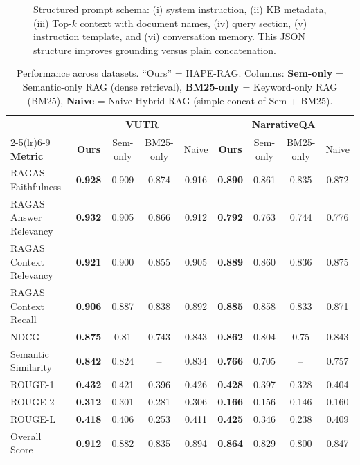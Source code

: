 \documentclass[10pt,twocolumn,letterpaper]{article}
\begin{document}
\begin{figure}[!ht]
    \centering
    
    \caption{Structured prompt schema: (i) system instruction, (ii) KB metadata, (iii) Top-$k$ context with document names, (iv) query section, (v) instruction template, and (vi) conversation memory. This JSON structure improves grounding versus plain concatenation.}
    \label{fig:system_prompt}
\end{figure}

\begin{table}[t]
\small
\centering
\caption{Performance across datasets. ``Ours'' = HAPE-RAG. Columns: \textbf{Sem-only} = Semantic-only RAG (dense retrieval), \textbf{BM25-only} = Keyword-only RAG (BM25), \textbf{Naive} = Naive Hybrid RAG (simple concat of Sem + BM25).}
\label{tab:overall_performance}
\setlength{\tabcolsep}{5.5pt}
\begin{tabular}{lcccc cccc}
\toprule
& \multicolumn{4}{c}{\textbf{VUTR}} & \multicolumn{4}{c}{\textbf{NarrativeQA}} \\
\cmidrule(lr){2-5}\cmidrule(lr){6-9}
\textbf{Metric} & \textbf{Ours} & Sem-only & BM25-only & Naive & \textbf{Ours} & Sem-only & BM25-only & Naive \\
\midrule
RAGAS Faithfulness      & \textbf{0.928} & 0.909 & 0.874 & 0.916 & \textbf{0.890} & 0.861 & 0.835 & 0.872 \\
RAGAS Answer Relevancy  & \textbf{0.932} & 0.905 & 0.866 & 0.912 & \textbf{0.792} & 0.763 & 0.744 & 0.776 \\
RAGAS Context Relevancy & \textbf{0.921} & 0.900 & 0.855 & 0.905 & \textbf{0.889} & 0.860 & 0.836 & 0.875 \\
RAGAS Context Recall    & \textbf{0.906} & 0.887 & 0.838 & 0.892 & \textbf{0.885} & 0.858 & 0.833 & 0.871 \\
NDCG                    & \textbf{0.875} & 0.81 & 0.743 & 0.843 & \textbf{0.862} & 0.804 & 0.75 & 0.843 \\
Semantic Similarity     & \textbf{0.842} & 0.824 & -- & 0.834 & \textbf{0.766} & 0.705 & -- & 0.757 \\
ROUGE-1                 & \textbf{0.432} & 0.421 & 0.396 & 0.426 & \textbf{0.428} & 0.397 & 0.328 & 0.404 \\
ROUGE-2                 & \textbf{0.312} & 0.301 & 0.281 & 0.306 & \textbf{0.166} & 0.156 & 0.146 & 0.160 \\
ROUGE-L                 & \textbf{0.418} & 0.406 & 0.253 & 0.411 & \textbf{0.425} & 0.346 & 0.238 & 0.409 \\
\midrule
Overall Score           & \textbf{0.912} & 0.882 & 0.835 & 0.894 & \textbf{0.864} & 0.829 & 0.800 & 0.847 \\
\bottomrule
\end{tabular}
\end{table}
\end{document}
